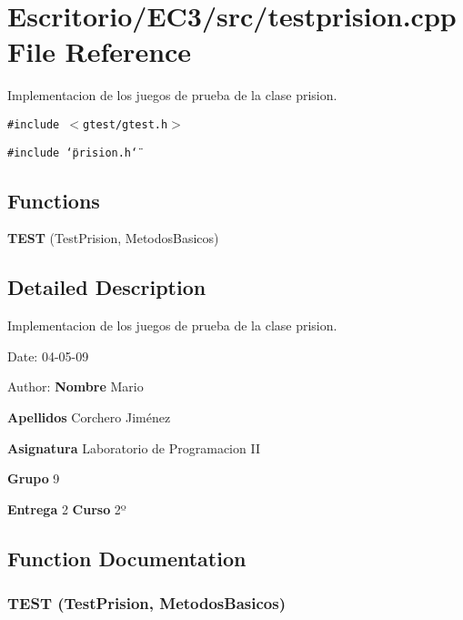 \section{Escritorio/EC3/src/testprision.cpp File Reference}
\label{testprision_8cpp}
Implementacion de los juegos de prueba de la clase prision. 

{\tt \#include $<$gtest/gtest.h$>$}\par
{\tt \#include \char`\"{}prision.h\char`\"{}}\par
\subsection*{Functions}
\begin{CompactItemize}
\item 
{\bf TEST} (TestPrision, MetodosBasicos)
\end{CompactItemize}


\subsection{Detailed Description}
Implementacion de los juegos de prueba de la clase prision. 

\begin{Desc}
\item[Date:]04-05-09 \end{Desc}
\begin{Desc}
\item[Author:]{\bf Nombre} Mario \par
 {\bf Apellidos} Corchero Jiménez \par
 {\bf Asignatura} Laboratorio de Programacion II \par
 {\bf Grupo} 9 \par
 {\bf Entrega} 2 {\bf Curso} 2º \end{Desc}


\subsection{Function Documentation}
\subsubsection{\setlength{\rightskip}{0pt plus 5cm}TEST (TestPrision, MetodosBasicos)}\label{testprision_8cpp_b1a960d5f05744786a3f81459eda7c5d}


